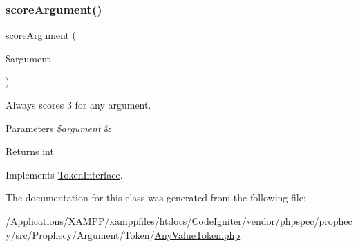 \subsubsection{\texorpdfstring{score\+Argument()}{scoreArgument()}}
{\footnotesize\ttfamily score\+Argument (\begin{DoxyParamCaption}\item[{}]{\$argument }\end{DoxyParamCaption})}

Always scores 3 for any argument.


\begin{DoxyParams}{Parameters}
{\em \$argument} & \\
\hline
\end{DoxyParams}
\begin{DoxyReturn}{Returns}
int 
\end{DoxyReturn}


Implements \mbox{\hyperlink{interface_prophecy_1_1_argument_1_1_token_1_1_token_interface_a8d5bf47ab6eaa935458d5ad160e52822}{Token\+Interface}}.



The documentation for this class was generated from the following file\+:\begin{DoxyCompactItemize}
\item 
/\+Applications/\+X\+A\+M\+P\+P/xamppfiles/htdocs/\+Code\+Igniter/vendor/phpspec/prophecy/src/\+Prophecy/\+Argument/\+Token/\mbox{\hyperlink{_any_value_token_8php}{Any\+Value\+Token.\+php}}\end{DoxyCompactItemize}
